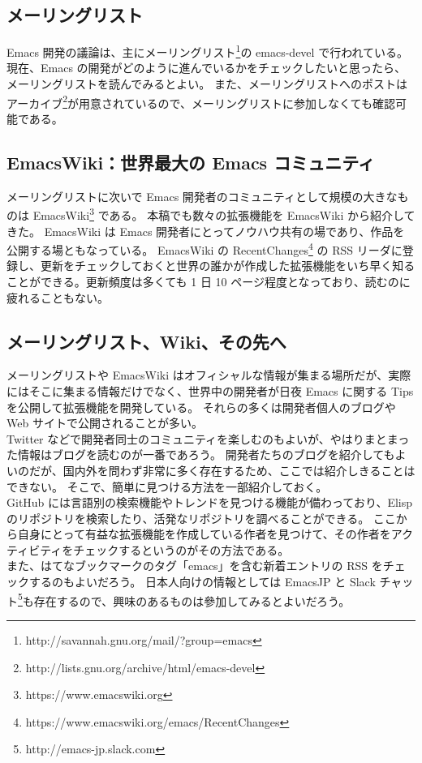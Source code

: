 \subsection{メーリングリスト}
Emacs 開発の議論は、主にメーリングリスト\footnote{http://savannah.gnu.org/mail/?group=emacs}の emacs-devel で行われている。
現在、Emacs の開発がどのように進んでいるかをチェックしたいと思ったら、メーリングリストを読んでみるとよい。
また、メーリングリストへのポストはアーカイブ\footnote{http://lists.gnu.org/archive/html/emacs-devel}が用意されているので、メーリングリストに参加しなくても確認可能である。
\subsection{EmacsWiki：世界最大の Emacs コミュニティ}
メーリングリストに次いで Emacs 開発者のコミュニティとして規模の大きなものは EmacsWiki\footnote{https://www.emacswiki.org} である。
本稿でも数々の拡張機能を EmacsWiki から紹介してきた。
EmacsWiki は Emacs 開発者にとってノウハウ共有の場であり、作品を公開する場ともなっている。
EmacsWiki の RecentChanges\footnote{https://www.emacswiki.org/emacs/RecentChanges} の RSS リーダに登録し、更新をチェックしておくと世界の誰かが作成した拡張機能をいち早く知ることができる。更新頻度は多くても 1 日 10 ページ程度となっており、読むのに疲れることもない。
\subsection{メーリングリスト、Wiki、その先へ}
メーリングリストや EmacsWiki はオフィシャルな情報が集まる場所だが、実際にはそこに集まる情報だけでなく、世界中の開発者が日夜 Emacs に関する Tips を公開して拡張機能を開発している。
それらの多くは開発者個人のブログや Web サイトで公開されることが多い。\\

Twitter などで開発者同士のコミュニティを楽しむのもよいが、やはりまとまった情報はブログを読むのが一番であろう。
開発者たちのブログを紹介してもよいのだが、国内外を問わず非常に多く存在するため、ここでは紹介しきることはできない。
そこで、簡単に見つける方法を一部紹介しておく。\\

GitHub には言語別の検索機能やトレンドを見つける機能が備わっており、Elisp のリポジトリを検索したり、活発なリポジトリを調べることができる。
ここから自身にとって有益な拡張機能を作成している作者を見つけて、その作者をアクティビティをチェックするというのがその方法である。\\

また、はてなブックマークのタグ「emacs」を含む新着エントリの RSS をチェックするのもよいだろう。
日本人向けの情報としては EmacsJP と Slack チャット\footnote{http://emacs-jp.slack.com}も存在するので、興味のあるものは參加してみるとよいだろう。
